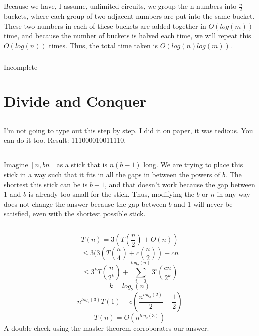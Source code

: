 \documentclass{article}
\begin{document}
\subsection{}
\subsubsection{}
Because we have, I assume, unlimited circuits, we group the n numbers into $\frac{n}{2}$ buckets, where each group of two adjacent numbers are put into the same bucket. These two numbers in each of these buckets are added together in $O(log(m))$ time, and because the number of buckets is halved each time, we will repeat this $O(log(n))$ times. Thus, the total time taken is $O(log(n)log(m))$.
\subsubsection{} Incomplete
\section{Divide and Conquer}
\subsection{}I'm not going to type out this step by step. I did it on paper, it was tedious. You can do it too. Result: 111000010011110.
\subsection{}Imagine $[n, bn]$ as a stick that is $n(b-1)$ long. We are trying to place this stick in a way such that it fits in all the gaps in between the powers of $b$. The shortest this stick can be is $b-1$, and that doesn't work because the gap between 1 and $b$ is already too small for the stick. Thus, modifying the $b$ or $n$ in any way does not change the answer because the gap between $b$ and 1 will never be satisfied, even with the shortest possible stick. 
\subsection{}
\subsubsection{}
$$T(n)=3(T(\frac{n}{2})+O(n))$$
$$\leq 3(3(T(\frac{n}{4})+c(\frac{n}{2}))+cn$$
$$\leq 3^kT(\frac{n}{2^k})+\sum_{i=0}^{log_2(n)}3^i(\frac{cn}{2^k})$$
$$k=log_2(n)$$
$$n^{log_2(3)}T(1)+c(\frac{n^{log_3(2)}}{2}-\frac{1}{2})$$
$$T(n) = O(n^{log_2(3)})$$
A double check using the master theorem corroborates our answer. 
\end{document}
